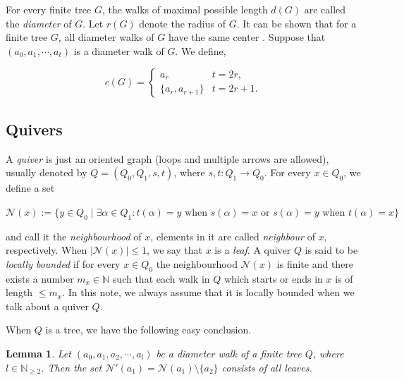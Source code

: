 \documentclass[a4paper,12pt]{amsart}
\newcommand{\cN}{\mathcal{N}}
\newtheorem{Lemma}[proposition]{Lemma}
\begin{document}
For every finite tree $G$, the walks of maximal possible length $d(G)$ are  called the \textit{diameter} of $G$.  Let $r(G)$ denote the radius of $G$. It can be shown that for a finite tree $G$, all diameter walks of $G$ have the same center  \cite[2.1]{Claus}. Suppose that $(a_0,a_1,\cdots,a_t)$ is a diameter walk of $G$.  We  define, 
\begin{center}
\[ c(G)=\begin{cases} 
     a_r & t=2r , \\
     \{a_r,a_{r+1}\} & t=2r+1.
   \end{cases}
\]
\end{center}
 


 
 








\subsection{Quivers}



 
A \textit{quiver} is just an oriented graph (loops and multiple arrows are allowed), usually denoted by  $Q=(Q_0, Q_1, s, t)$, where $s,t: Q_1\rightarrow Q_0$.  For every $x\in Q_0$, we define a set 

\begin{center}
$\mathcal{N}(x):=\{y\in Q_0\mid \exists \alpha \in Q_1: t(\alpha)=y \text{ when } s(\alpha)=x \text{ or } s(\alpha)=y \text{ when } t(\alpha)=x\}$
\end{center}
and call it the \textit{neighbourhood} of $x$, elements in it are called \textit{neighbour} of $x$, respectively. When $\mid \mathcal{N}(x)\mid \leq 1$,  we say that $x$  is a  \textit{leaf}. A quiver $Q$  is said to be \textit{locally bounded} if for every $x\in Q_0$ the neighbourhood $\cN(x)$ is finite and there exists a number $m_x\in \mathbb{N}$ such that  each walk in $Q$ which starts or ends in $x$ is of length $\leq m_x$. In this note, we always assume that it is locally bounded when we talk about a quiver $Q$.


When $Q$ is a tree, we have the following easy conclusion.

 \begin{Lemma}\label{l}
Let $(a_0, a_1, a_2, \cdots, a_l)$ be a diameter walk of  a finite tree $Q$, where $l\in\mathbb{N}_{\geq 2}$. Then the  set $\mathcal{N}'(a_1)=\mathcal{N}(a_1)\setminus \{a_2\}$ consists of  all leaves.
\end{Lemma}
\end{document}

